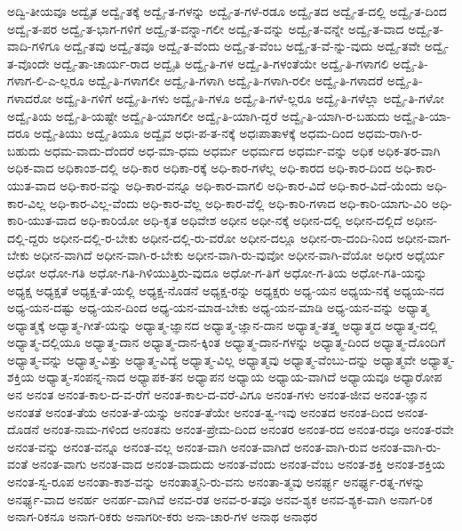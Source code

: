 {ಅದ್ವಿ-ತೀಯವೂ
ಅದ್ವೈತ
ಅದ್ವೈ-ತಕ್ಕೆ
ಅದ್ವೈ-ತ-ಗಳನ್ನು
ಅದ್ವೈ-ತ-ಗಳೆ-ರಡೂ
ಅದ್ವೈ-ತದ
ಅದ್ವೈ-ತ-ದಲ್ಲಿ
ಅದ್ವೈ-ತ-ದಿಂದ
ಅದ್ವೈ-ತ-ಪರ
ಅದ್ವೈ-ತ-ಭಾಗ-ಗಳಿಗೆ
ಅದ್ವೈ-ತ-ವನ್ನಾ-ಗಲೀ
ಅದ್ವೈ-ತ-ವನ್ನು
ಅದ್ವೈ-ತ-ವನ್ನೇ
ಅದ್ವೈ-ತ-ವಾದ
ಅದ್ವೈ-ತ-ವಾದಿ-ಗಳಿಗೂ
ಅದ್ವೈ-ತವು
ಅದ್ವೈ-ತವೂ
ಅದ್ವೈ-ತ-ವೆಂದು
ಅದ್ವೈ-ತ-ವೆಂಬ
ಅದ್ವೈ-ತ-ವೆ-ನ್ನು-ವುದು
ಅದ್ವೈ-ತವೇ
ಅದ್ವೈ-ತ-ವೊಂದೇ
ಅದ್ವೈ-ತಾ-ಚಾರ್ಯ-ರಾದ
ಅದ್ವೈತಿ
ಅದ್ವೈ-ತಿ-ಗಳ
ಅದ್ವೈ-ತಿ-ಗಳಂತೆಯೇ
ಅದ್ವೈ-ತಿ-ಗಳಾಗಲಿ
ಅದ್ವೈ-ತಿ-ಗಳಾಗ-ಲಿ-ಎ-ಲ್ಲರೂ
ಅದ್ವೈ-ತಿ-ಗಳಾಗಲೀ
ಅದ್ವೈ-ತಿ-ಗಳಾಗಿ
ಅದ್ವೈ-ತಿ-ಗಳಾಗಿ-ರಲೀ
ಅದ್ವೈ-ತಿ-ಗಳಾದರೆ
ಅದ್ವೈ-ತಿ-ಗಳಾದರೋ
ಅದ್ವೈ-ತಿ-ಗಳಿಗೆ
ಅದ್ವೈ-ತಿ-ಗಳು
ಅದ್ವೈ-ತಿ-ಗಳೂ
ಅದ್ವೈ-ತಿ-ಗಳೆ-ಲ್ಲರೂ
ಅದ್ವೈ-ತಿ-ಗಳೆಲ್ಲಾ
ಅದ್ವೈ-ತಿ-ಗಳೋ
ಅದ್ವೈ-ತಿಯ
ಅದ್ವೈ-ತಿ-ಯಷ್ಟೇ
ಅದ್ವೈ-ತಿ-ಯಾಗಲೀ
ಅದ್ವೈ-ತಿ-ಯಾಗಿ-ದ್ದರೆ
ಅದ್ವೈ-ತಿ-ಯಾಗಿ-ರ-ಬಹುದು
ಅದ್ವೈ-ತಿ-ಯಾ-ದರೂ
ಅದ್ವೈ-ತಿಯು
ಅದ್ವೈ-ತಿಯೂ
ಅದ್ವೈವ
ಅಧಃ-ಪ-ತ-ನಕ್ಕೆ
ಅಧಃಪಾತಾಳಕ್ಕೆ
ಅಧಮ-ದಿಂದ
ಅಧಮ-ರಾಗಿ-ರ-ಬಹುದು
ಅಧಮ-ವಾದು-ದೆಂದರೆ
ಅಧ-ಮಾ-ಧಮ
ಅಧರ್ಮ
ಅಧರ್ಮದ
ಅಧರ್ಮ-ವನ್ನು
ಅಧಿಕ
ಅಧಿಕ-ತರ-ವಾಗಿ
ಅಧಿಕ-ವಾದ
ಅಧಿಕಾಂಶ-ದಲ್ಲಿ
ಅಧಿ-ಕಾರ
ಅಧಿಕಾ-ರಕ್ಕೆ
ಅಧಿ-ಕಾರ-ಗಳೆಲ್ಲ
ಅಧಿ-ಕಾರದ
ಅಧಿ-ಕಾರ-ದಿಂದ
ಅಧಿ-ಕಾರ-ಯುತ-ವಾದ
ಅಧಿ-ಕಾರ-ವನ್ನು
ಅಧಿ-ಕಾರ-ವನ್ನೂ
ಅಧಿ-ಕಾರ-ವಾಗಲಿ
ಅಧಿ-ಕಾರ-ವಿದೆ
ಅಧಿ-ಕಾರ-ವಿದೆ-ಯೆಂದು
ಅಧಿ-ಕಾರ-ವಿಲ್ಲ
ಅಧಿ-ಕಾರ-ವಿಲ್ಲ-ವೆಂದು
ಅಧಿ-ಕಾರ-ವೆಲ್ಲ
ಅಧಿ-ಕಾರ-ವೆಲ್ಲಿ
ಅಧಿ-ಕಾರಿ-ಗಳಾದ
ಅಧಿ-ಕಾರಿ-ಯಾಗು-ವಿರಿ
ಅಧಿ-ಕಾರಿ-ಯುತ-ವಾದ
ಅಧಿ-ಕಾರಿಯೋ
ಅಧಿ-ಕೃತ
ಅಧಿವೇಶ
ಅಧೀನ
ಅಧೀ-ನಕ್ಕೆ
ಅಧೀನ-ದಲ್ಲಿ
ಅಧೀನ-ದಲ್ಲಿದೆ
ಅಧೀನ-ದಲ್ಲಿ-ದ್ದರು
ಅಧೀನ-ದಲ್ಲಿ-ರ-ಬೇಕು
ಅಧೀನ-ದಲ್ಲಿ-ರು-ವರೋ
ಅಧೀನ-ದಲ್ಲೂ
ಅಧೀನ-ರಾ-ದಂದಿ-ನಿಂದ
ಅಧೀನ-ವಾಗ-ಬೇಕು
ಅಧೀನ-ವಾಗಿದೆ
ಅಧೀನ-ವಾಗಿ-ರ-ಬೇಕು
ಅಧೀನ-ವಾಗಿ-ರು-ವುವೋ
ಅಧೀನ-ವಾಗಿ-ವೆಯೋ
ಅಧೀರ
ಅಧೈರ್ಯ
ಅಧೋ
ಅಧೋ-ಗತಿ
ಅಧೋ-ಗತಿ-ಗಿಳಿಯುತ್ತಿರು-ವುದೂ
ಅಧೋ-ಗ-ತಿಗೆ
ಅಧೋ-ಗ-ತಿಯ
ಅಧೋ-ಗತಿ-ಯನ್ನು
ಅಧ್ಯಕ್ಷ
ಅಧ್ಯಕ್ಷತೆ
ಅಧ್ಯಕ್ಷ-ತೆ-ಯಲ್ಲಿ
ಅಧ್ಯಕ್ಷ-ನೊಡನೆ
ಅಧ್ಯಕ್ಷ-ರನ್ನು
ಅಧ್ಯಕ್ಷರು
ಅಧ್ಯ-ಯನ
ಅಧ್ಯಯ-ನಕ್ಕೆ
ಅಧ್ಯಯ-ನದ
ಅಧ್ಯ-ಯನ-ದಷ್ಟು
ಅಧ್ಯ-ಯನ-ದಿಂದ
ಅಧ್ಯ-ಯನ-ಮಾಡ-ಬೇಕು
ಅಧ್ಯ-ಯನ-ಮಾಡಿ
ಅಧ್ಯ-ಯನ-ವನ್ನು
ಅಧ್ಯಾತ್ಮ
ಅಧ್ಯಾತ್ಮಕ್ಕೆ
ಅಧ್ಯಾತ್ಮ-ಗೀತೆ-ಯನ್ನು
ಅಧ್ಯಾತ್ಮ-ಜ್ಞಾನದ
ಅಧ್ಯಾತ್ಮ-ಜ್ಞಾನ-ದಾನ
ಅಧ್ಯಾತ್ಮ-ತತ್ತ್ವ
ಅಧ್ಯಾತ್ಮದ
ಅಧ್ಯಾತ್ಮ-ದಲ್ಲಿ
ಅಧ್ಯಾತ್ಮ-ದಲ್ಲಿಯೂ
ಅಧ್ಯಾತ್ಮ-ದಾನ
ಅಧ್ಯಾತ್ಮ-ದಾನ-ಕ್ಕಿಂತ
ಅಧ್ಯಾತ್ಮ-ದಾನ-ಗಳನ್ನು
ಅಧ್ಯಾತ್ಮ-ದಿಂದ
ಅಧ್ಯಾತ್ಮ-ದೊಂದಿಗೆ
ಅಧ್ಯಾತ್ಮ-ವನ್ನು
ಅಧ್ಯಾತ್ಮ-ವಿತ್ತು
ಅಧ್ಯಾತ್ಮ-ವಿದ್ಯೆ
ಅಧ್ಯಾತ್ಮ-ವಿಲ್ಲ
ಅಧ್ಯಾತ್ಮವು
ಅಧ್ಯಾತ್ಮ-ವೆಂಬು-ದನ್ನು
ಅಧ್ಯಾತ್ಮವೇ
ಅಧ್ಯಾತ್ಮ-ಶಕ್ತಿಯ
ಅಧ್ಯಾತ್ಮ-ಸಂಪನ್ನ-ನಾದ
ಅಧ್ಯಾಪಕ-ತನ
ಅಧ್ಯಾಪನ
ಅಧ್ಯಾಯ
ಅಧ್ಯಾಯ-ವಾಗಿದೆ
ಅಧ್ಯಾಯವೂ
ಅಧ್ಯಾರೋಪ
ಅನ
ಅನಂತ
ಅನಂತ-ಕಾಲ-ದ-ವ-ರೆಗೆ
ಅನಂತ-ಕಾಲ-ದ-ವರೆ-ವಿಗೂ
ಅನಂತ-ಗಳು
ಅನಂತ-ಜೀವ
ಅನಂತ-ಜ್ಞಾನ
ಅನಂತತೆ
ಅನಂತ-ತೆಯ
ಅನಂತ-ತೆ-ಯನ್ನು
ಅನಂತ-ತೆಯೇ
ಅನಂತ-ತ್ವ-ಇವು
ಅನಂತದ
ಅನಂತ-ದಿಂದ
ಅನಂತ-ದೊಡನೆ
ಅನಂತ-ನಾಮ-ಗಳಿಂದ
ಅನಂತನು
ಅನಂತ-ಪ್ರೇಮ-ದಿಂದ
ಅನಂತರ
ಅನಂತ-ರದ
ಅನಂತ-ರವೂ
ಅನಂತ-ರವೇ
ಅನಂತ-ವನ್ನು
ಅನಂತ-ವನ್ನೂ
ಅನಂತ-ವಲ್ಲ
ಅನಂತ-ವಾಗಿ
ಅನಂತ-ವಾಗಿದೆ
ಅನಂತ-ವಾಗಿ-ರುವ
ಅನಂತ-ವಾಗಿ-ರು-ವಂತೆ
ಅನಂತ-ವಾಗು
ಅನಂತ-ವಾದ
ಅನಂತ-ವಾದುದು
ಅನಂತ-ವೆಂದು
ಅನಂತ-ವೆಂಬ
ಅನಂತ-ಶಕ್ತಿ
ಅನಂತ-ಶಕ್ತಿಯ
ಅನಂತ-ಸ್ವ-ರೂಪ
ಅನಂತಾ-ಕಾಶ-ವನ್ನು
ಅನಂತಾತ್ಮನಿ-ರು-ವನು
ಅನಂತಾ-ತ್ಮವು
ಅನರ್ಘ್ಯ
ಅನರ್ಘ್ಯ-ರತ್ನ-ಗಳನ್ನು
ಅನರ್ಘ್ಯ-ವಾದ
ಅನರ್ಹ
ಅನರ್ಹ-ವಾಗಿವೆ
ಅನವ-ರತ
ಅನವ-ರ-ತವೂ
ಅನವ-ಶ್ಯಕ
ಅನವ-ಶ್ಯಕ-ವಾಗಿ
ಅನಾಗ-ರಿಕ
ಅನಾಗ-ರಿಕನೂ
ಅನಾಗ-ರಿಕರು
ಅನಾಗರೀ-ಕರು
ಅನಾ-ಚಾರ-ಗಳ
ಅನಾಥ
ಅನಾಥರ
}
